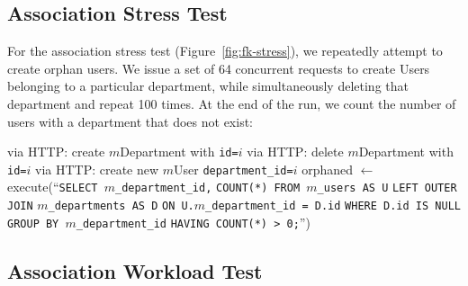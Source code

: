 \subsection{Association Stress Test}
\label{sec:appendix-association-stress}

For the association stress test (Figure~\ref{fig:fk-stress}), we repeatedly attempt to create orphan users. We issue a set of 64 concurrent requests to create Users belonging to a particular department, while simultaneously deleting that department and repeat 100 times. At the end of the run, we count the number of users with a department that does not exist:\vspace{-.5em}
\begin{algorithm}[H]
\begin{algorithmic}

    \State via HTTP: create $m$Department with \texttt{id=$i$}
  \EndFor
        \State via HTTP: delete $m$Department with \texttt{id=$i$}
      \Else
        \State via HTTP: create new $m$User \texttt{department\_id=$i$}
      \EndIf        
     \EndParFor
   \EndFor
   \State orphaned $\gets $execute(``\texttt{SELECT $m$\_department\_id,}
   \State \hspace{8.5em}\texttt{COUNT(*) FROM $m$\_users AS U}
   \State \hspace{8.5em}\texttt{LEFT OUTER JOIN} \texttt{$m$\_departments AS D}
   \State \hspace{8.5em}\texttt{ON U.$m$\_department\_id = D.id}
   \State \hspace{8.5em}\texttt{WHERE D.id IS NULL}
   \State \hspace{8.5em}\texttt{GROUP BY $m$\_department\_id}
   \State \hspace{8.5em}\texttt{HAVING COUNT(*) > 0;}'')
\EndFor
\end{algorithmic}
\end{algorithm}

\subsection{Association Workload Test}
\label{sec:appendix-association-workload}

